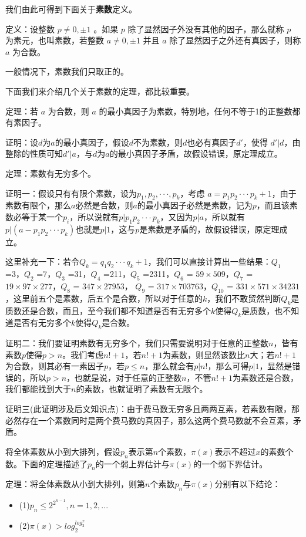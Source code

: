 \documentclass[12pt, a4paper, oneside]{ctexart}
\begin{document}
我们由此可得到下面关于\textbf{素数}定义。

定义：设整数 $p\neq0,\pm1$ 。如果 $p$ 除了显然因子外没有其他的因子，那么就称 $p$ 为素元，也叫素数，若整数 $a\neq0,\pm1$ 并且 $a$ 除了显然因子之外还有真因子，则称 $a$ 为合数。

一般情况下，素数我们只取正的。

下面我们来介绍几个关于素数的定理，都比较重要。

定理：若 $a$ 为合数，则 $a$ 的最小真因子为素数，特别地，任何不等于1的正整数都有素因子。

证明：设$d$为$a$的最小真因子，假设$d$不为素数，则$d$也必有真因子$d'$，使得 $d'|d$，由整除的性质可知$d'|a$，与$d$为$a$的最小真因子矛盾，故假设错误，原定理成立。

定理：素数有无穷多个。

证明一：假设只有有限个素数，设为$p_1,p_2,\cdot\cdot\cdot,p_k$，考虑 $a=p_1p_2\cdot\cdot\cdot p_k+1$，由于素数有限个，那么$a$必然是合数，则$a$的最小真因子必然是素数，记为$p$，而且该素数必等于某一个$p_i$，所以说就有$p|p_1p_2\cdot\cdot\cdot p_k$，又因为$p|a$，所以就有$p|(a-p_1p_2\cdot\cdot\cdot p_k)$也就是$p|1$，这与$p$是素数是矛盾的，故假设错误，原定理成立。

这里补充一下：若令$Q_k=q_1q_2\cdot\cdot\cdot q_k+1$，我们可以直接计算出一些结果：$Q_1$ =3，$Q_2$ =7，$Q_3$ =31，$Q_4$ =211，$Q_5$ =2311，$Q_6$ = $59\times509$，$Q_7$ = $19\times97\times277$，$Q_8$ = $347\times27953$， $Q_9$ = $317\times703763$，$Q_{10}$ = $331\times571\times34231$，这里前五个是素数，后五个是合数，所以对于任意的$k$，我们不敢贸然判断$Q_k$是质数还是合数，而且，至今我们都不知道是否有无穷多个$k$使得$Q_k$是质数，也不知道是否有无穷多个$k$使得$Q_k$是合数。

证明二：我们要证明素数有无穷多个，我们只需要说明对于任意的正整数$n$，皆有素数$p$使得$p>n$。我们考虑$n!+1$，若$n!+1$为素数，则显然该数比$n$大；若$n!+1$为合数，则其必有一素因子$p$，若$p\leqslant n$，那么就会有$p|n!$，那么可得$p|1$，显然是错误的，所以$p>n$，也就是说，对于任意的正整数$n$，不管$n!+1$为素数还是合数，我们都能找到大于$n$的素数，也就证明了素数有无限个。

证明三(此证明涉及后文知识点)：由于费马数无穷多且两两互素，若素数有限，那必然存在一个素数同时是两个费马数的真因子，那么这两个费马数就不会互素，矛盾。

将全体素数从小到大排列，假设$p_n$表示第$n$个素数，$\pi(x)$表示不超过$x$的素数个数。下面的定理描述了$p_n$的一个弱上界估计与$\pi(x)$的一个弱下界估计。

定理：将全体素数从小到大排列，则第$n$个素数$p_n$与$\pi(x)$分别有以下结论：
\begin{itemize}
\item (1)$p_n\leqslant 2^{2^{n-1}},n=1,2,...$
\item (2)$\pi(x)>log_2^{log_2^x}$
\end{itemize}
\end{document}
